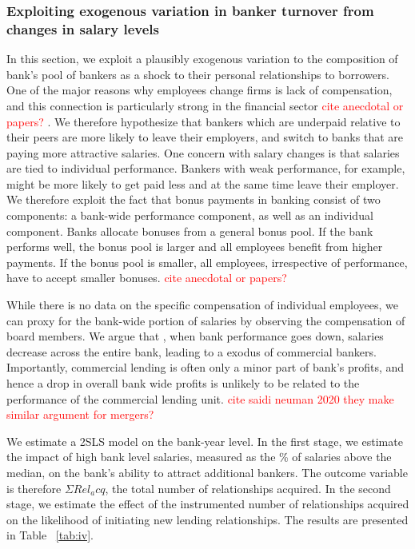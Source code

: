\subsubsection{Exploiting exogenous variation in banker turnover from changes in salary levels}

In this section, we exploit a plausibly exogenous variation to the composition of bank's pool of bankers as a shock to their personal relationships to borrowers. One of the major reasons why employees change firms is lack of compensation, and this connection is particularly strong in the financial sector \textcolor{red}{cite anecdotal or papers?} . We therefore hypothesize that bankers which are underpaid relative to their peers are more likely to leave their employers, and switch to banks that are paying more attractive salaries. One concern with salary changes is that salaries are tied to individual performance. Bankers with weak performance, for example,  might be more likely to get paid less and at the same time leave their employer. We therefore exploit the fact that bonus payments in banking consist of two components: a bank-wide performance component, as well as an individual component. Banks allocate bonuses from a general bonus pool. If the bank performs well, the bonus pool is larger and all employees benefit from higher payments. If the bonus pool is smaller, all employees, irrespective of performance, have to accept smaller bonuses.  \textcolor{red}{cite anecdotal or papers?}

While there is no data on the specific compensation of individual employees, we can proxy for the bank-wide portion of salaries by observing the compensation of board members. We argue that , when bank performance goes down, salaries decrease across the entire bank, leading to a exodus of commercial bankers. Importantly, commercial lending is often only a minor part of bank's profits, and hence a drop in overall bank wide profits is unlikely to be related to the performance of the commercial lending unit. \textcolor{red}{cite saidi neuman 2020 they make similar argument for mergers?} 

We estimate a 2SLS model on the bank-year level. In the first stage, we estimate the impact of high bank level salaries, measured as the \% of salaries above the median, on the bank's ability to attract additional bankers. The outcome variable is therefore $\Sigma Rel_acq$, the total number of relationships acquired. In the second stage, we estimate the effect of the instrumented number of relationships acquired on the likelihood of initiating new lending relationships. The results are presented in Table ~\ref{tab:iv}.

